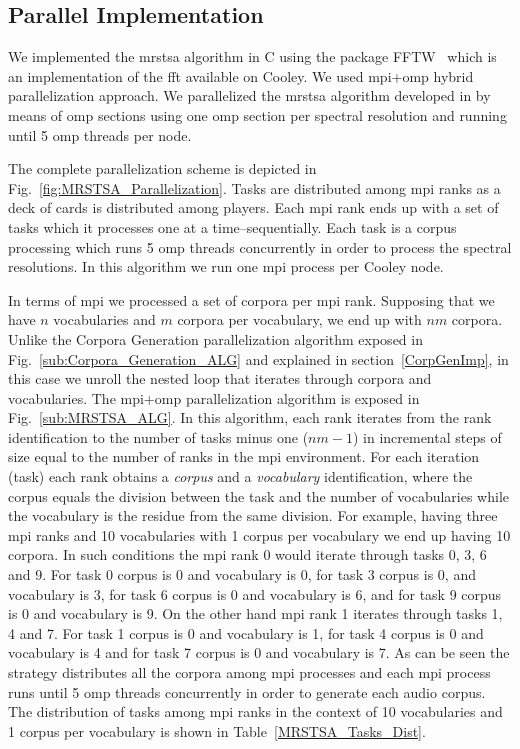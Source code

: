 \documentclass[10pt,journal,compsoc]{IEEEtran}
\begin{document}
\subsection{ Parallel Implementation}

We implemented the \gls{mrstsa} algorithm in C using the package FFTW~\cite{fftw} which is an implementation of the \gls{fft} available on Cooley. We used \gls{mpi}+\gls{omp} hybrid parallelization approach. We parallelized the \gls{mrstsa} algorithm developed in \cite{Dematties2018} by means of \gls{omp} sections using one \gls{omp} section per spectral resolution and running until 5 \gls{omp} threads per node.

The complete parallelization scheme is depicted in Fig.~\ref{fig:MRSTSA_Parallelization}. Tasks are distributed among \gls{mpi} ranks as a deck of cards is distributed among players. Each \gls{mpi} rank ends up with a set of tasks which it processes one at a time--sequentially. Each task is a corpus processing which runs 5 \gls{omp} threads concurrently in order to process the spectral resolutions. In this algorithm we run one \gls{mpi} process per Cooley node.%

In terms of \gls{mpi} we processed a set of corpora per \gls{mpi} rank. Supposing that we have $n$ vocabularies and $m$ corpora per vocabulary, we end up with $n m$ corpora. Unlike the Corpora Generation parallelization algorithm exposed in Fig.~\ref{sub:Corpora_Generation_ALG} and explained in section~\ref{CorpGenImp}, in this case we unroll the nested loop that iterates through corpora and vocabularies. The \gls{mpi}+\gls{omp} parallelization algorithm is exposed in Fig.~\ref{sub:MRSTSA_ALG}. In this algorithm, each rank iterates from the rank identification to the number of tasks minus one ($n m - 1$) in incremental steps of size equal to the number of ranks in the \gls{mpi} environment. For each iteration (task) each rank obtains a \emph{corpus} and a \emph{vocabulary} identification, where the corpus equals the division between the task and the number of vocabularies while the vocabulary is the residue from the same division. For example, having three \gls{mpi} ranks and 10 vocabularies with 1 corpus per vocabulary we end up having 10 corpora. In such conditions the \gls{mpi} rank 0 would iterate through tasks 0, 3, 6 and 9. For task 0 corpus is 0 and vocabulary is 0, for task 3 corpus is 0, and vocabulary is 3, for task 6 corpus is 0 and vocabulary is 6, and for task 9 corpus is 0 and vocabulary is 9. On the other hand \gls{mpi} rank 1 iterates through tasks 1, 4 and 7. For task 1 corpus is 0 and vocabulary is 1, for task 4 corpus is 0 and vocabulary is 4 and for task 7 corpus is 0 and vocabulary is 7. As can be seen the strategy distributes all the corpora among \gls{mpi} processes and each \gls{mpi} process runs until 5 \gls{omp} threads concurrently in order to generate each audio corpus. The distribution of tasks among \gls{mpi} ranks in the context of 10 vocabularies and 1 corpus per vocabulary is shown in Table~\ref{MRSTSA_Tasks_Dist}. 
\end{document}
